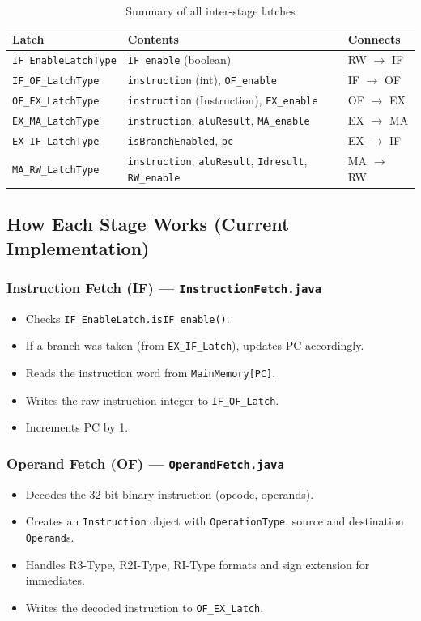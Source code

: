 \documentclass[12pt,a4paper]{article}
\begin{document}
\begin{table}[H]
\centering
\begin{tabular}{@{}lll@{}}
\toprule
\textbf{Latch} & \textbf{Contents} & \textbf{Connects} \\
\midrule
\texttt{IF\_EnableLatchType} & \texttt{IF\_enable} (boolean) & RW $\rightarrow$ IF \\
\texttt{IF\_OF\_LatchType} & \texttt{instruction} (int), \texttt{OF\_enable} & IF $\rightarrow$ OF \\
\texttt{OF\_EX\_LatchType} & \texttt{instruction} (Instruction), \texttt{EX\_enable} & OF $\rightarrow$ EX \\
\texttt{EX\_MA\_LatchType} & \texttt{instruction}, \texttt{aluResult}, \texttt{MA\_enable} & EX $\rightarrow$ MA \\
\texttt{EX\_IF\_LatchType} & \texttt{isBranchEnabled}, \texttt{pc} & EX $\rightarrow$ IF \\
\texttt{MA\_RW\_LatchType} & \texttt{instruction}, \texttt{aluResult}, \texttt{Idresult}, \texttt{RW\_enable} & MA $\rightarrow$ RW \\
\bottomrule
\end{tabular}
\caption{Summary of all inter-stage latches}
\end{table}

\subsection{How Each Stage Works (Current Implementation)}

\subsubsection{Instruction Fetch (IF) --- \texttt{InstructionFetch.java}}
\begin{itemize}
    \item Checks \texttt{IF\_EnableLatch.isIF\_enable()}.
    \item If a branch was taken (from \texttt{EX\_IF\_Latch}), updates PC accordingly.
    \item Reads the instruction word from \texttt{MainMemory[PC]}.
    \item Writes the raw instruction integer to \texttt{IF\_OF\_Latch}.
    \item Increments PC by 1.
\end{itemize}

\subsubsection{Operand Fetch (OF) --- \texttt{OperandFetch.java}}
\begin{itemize}
    \item Decodes the 32-bit binary instruction (opcode, operands).
    \item Creates an \texttt{Instruction} object with \texttt{OperationType}, source and destination \texttt{Operand}s.
    \item Handles R3-Type, R2I-Type, RI-Type formats and sign extension for immediates.
    \item Writes the decoded instruction to \texttt{OF\_EX\_Latch}.
\end{itemize}
\end{document}
